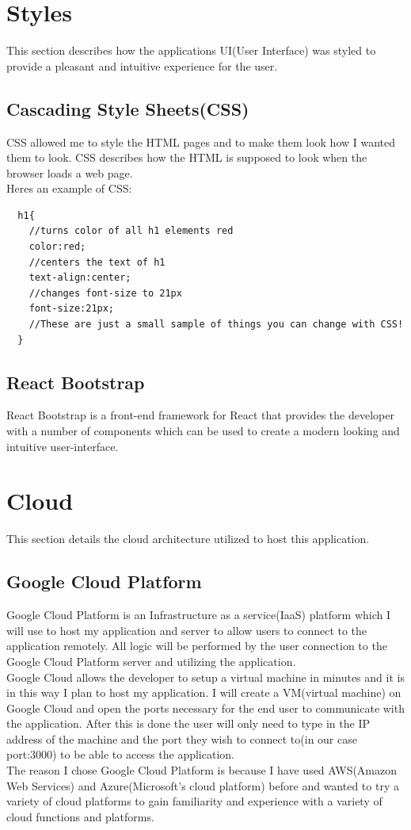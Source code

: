 \section{Styles}
This section describes how the applications UI(User Interface) was styled to provide a pleasant and intuitive experience for the user.
\subsection{Cascading Style Sheets(CSS)}
CSS allowed me to style the HTML pages and to make them look how I wanted them to look.  CSS describes how the HTML is supposed to look when the browser loads a web page.
\\
Heres an example of CSS:
\begin{verbatim}
  h1{
    //turns color of all h1 elements red
    color:red;
    //centers the text of h1
    text-align:center;
    //changes font-size to 21px
    font-size:21px;
    //These are just a small sample of things you can change with CSS!
  }
\end{verbatim}
\subsection{React Bootstrap}
React Bootstrap is a front-end framework for React that provides the developer with a number of components which can be used to create a modern looking and intuitive user-interface.
\section{Cloud}
This section details the cloud architecture utilized to host this application.
\subsection{Google Cloud Platform}
Google Cloud Platform is an Infrastructure as a service(IaaS) platform which I will use to host my application and server to allow users to connect to the application remotely\cite{GoogleCloudPlatform}.  All logic will be performed by the user connection to the Google Cloud Platform server and utilizing the application.
\\
Google Cloud allows the developer to setup a virtual machine in minutes and it is in this way I plan to host my application.  I will create a VM(virtual machine) on Google Cloud and open the ports necessary for the end user to communicate with the application.  After this is done the user will only need to type in the IP address of the machine and the port they wish to connect to(in our case port:3000) to be able to access the application.
\\
  The reason I chose Google Cloud Platform is because I have used AWS(Amazon Web Services) and Azure(Microsoft's cloud platform) before and wanted to try a variety of cloud platforms to gain familiarity and experience with a variety of cloud functions and platforms.
